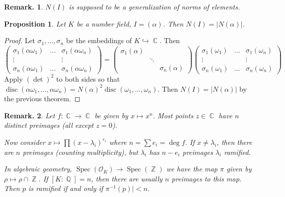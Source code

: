 \documentclass[11pt, a4paper]{memoir}
\DeclareMathOperator{\Q}{{\mathbb{Q}}}
\DeclareMathOperator{\Z}{{\mathbb{Z}}}
\DeclareMathOperator{\C}{{\mathbb{C}}}
\theoremstyle{change}
\newtheorem{proposition}[theorem]{Proposition}
\theoremstyle{plain}
\theoremstyle{nonumberplain}
\newtheorem{remark}{Remark.}
\newtheorem{proof}{Proof}
\DeclareMathOperator{\disc}{disc}
\DeclareMathOperator{\Spec}{Spec}
\begin{document}
\begin{remark}
    $N(I)$ is supposed to be a generalization of norms of elements.
\end{remark}
\begin{proposition}
    Let $K$ be a number field, $I=(\alpha)$.
    Then $N(I)=|N(\alpha)|$.
\end{proposition}
\begin{proof}
    Let $\sigma_1,\ldots,\sigma_n$ be the embeddings of $K\hookrightarrow\C$.
    Then
    \begin{equation*}
        \begin{pmatrix}
            \sigma_1(\alpha\omega_1) &\hdots&\sigma_1(\alpha\omega_n)\\
            \vdots&&\vdots\\
            \sigma_n(\alpha\omega_1) &\hdots&\sigma_n(\alpha\omega_n)
        \end{pmatrix}
    =
        \begin{pmatrix}
            \sigma_1(\alpha) &&\\
                             &\ddots&\\
                             &&\sigma_n(\alpha)
        \end{pmatrix}
        \begin{pmatrix}
            \sigma_1(\omega_1) &\hdots&\sigma_1(\omega_n)\\
            \vdots&&\vdots\\
            \sigma_n(\omega_1) &\hdots&\sigma_n(\omega_n)
        \end{pmatrix}
    \end{equation*}
    Apply $(\det)^2$ to both sides so that $\disc(\alpha\omega_1,\ldots,\alpha\omega_n)=N(\alpha)^2\disc(\omega_1,\ldots,\omega_n)$.
    Then $N(I)=|N(\alpha)|$ by the previous theorem.
\end{proof}
\begin{remark}
    Let $f:\C\to\C$ be given by $x\mapsto x^n$.
    Most points $z\in\C$ have $n$ distinct preimages (all except $z=0$).

    Now consider $x\mapsto\prod(x-\lambda_i)^{e_i}$ where $n=\sum e_i=\deg f$.
    If $x\neq\lambda_i$, then there are $n$ preimages (counting multiplicity), but $\lambda_i$ has $n-e_i$ preimages $\lambda_i$ ramified.

    In algebraic geometry, $\Spec(\mathcal{O}_K)\to\Spec(\Z)$ we have the map $\pi$ given by $\rho\mapsto\rho\cap\Z$.
    If $[K:\Q]=n$, then there are usually $n$ preimages to this map.
    Then $p$ is ramified if and only if $\pi^{-1}(p)|<n$.
\end{remark}
\end{document}
